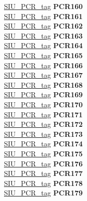 \begin{DoxyCompactItemize}
\begin{tabbing}
\>\>\mbox{\hyperlink{unionSIU__tag_1_1SIU__PCR__tag}{SIU\_PCR\_tag}} {\bfseries PCR160}\\
\>\>\mbox{\hyperlink{unionSIU__tag_1_1SIU__PCR__tag}{SIU\_PCR\_tag}} {\bfseries PCR161}\\
\>\>\mbox{\hyperlink{unionSIU__tag_1_1SIU__PCR__tag}{SIU\_PCR\_tag}} {\bfseries PCR162}\\
\>\>\mbox{\hyperlink{unionSIU__tag_1_1SIU__PCR__tag}{SIU\_PCR\_tag}} {\bfseries PCR163}\\
\>\>\mbox{\hyperlink{unionSIU__tag_1_1SIU__PCR__tag}{SIU\_PCR\_tag}} {\bfseries PCR164}\\
\>\>\mbox{\hyperlink{unionSIU__tag_1_1SIU__PCR__tag}{SIU\_PCR\_tag}} {\bfseries PCR165}\\
\>\>\mbox{\hyperlink{unionSIU__tag_1_1SIU__PCR__tag}{SIU\_PCR\_tag}} {\bfseries PCR166}\\
\>\>\mbox{\hyperlink{unionSIU__tag_1_1SIU__PCR__tag}{SIU\_PCR\_tag}} {\bfseries PCR167}\\
\>\>\mbox{\hyperlink{unionSIU__tag_1_1SIU__PCR__tag}{SIU\_PCR\_tag}} {\bfseries PCR168}\\
\>\>\mbox{\hyperlink{unionSIU__tag_1_1SIU__PCR__tag}{SIU\_PCR\_tag}} {\bfseries PCR169}\\
\>\>\mbox{\hyperlink{unionSIU__tag_1_1SIU__PCR__tag}{SIU\_PCR\_tag}} {\bfseries PCR170}\\
\>\>\mbox{\hyperlink{unionSIU__tag_1_1SIU__PCR__tag}{SIU\_PCR\_tag}} {\bfseries PCR171}\\
\>\>\mbox{\hyperlink{unionSIU__tag_1_1SIU__PCR__tag}{SIU\_PCR\_tag}} {\bfseries PCR172}\\
\>\>\mbox{\hyperlink{unionSIU__tag_1_1SIU__PCR__tag}{SIU\_PCR\_tag}} {\bfseries PCR173}\\
\>\>\mbox{\hyperlink{unionSIU__tag_1_1SIU__PCR__tag}{SIU\_PCR\_tag}} {\bfseries PCR174}\\
\>\>\mbox{\hyperlink{unionSIU__tag_1_1SIU__PCR__tag}{SIU\_PCR\_tag}} {\bfseries PCR175}\\
\>\>\mbox{\hyperlink{unionSIU__tag_1_1SIU__PCR__tag}{SIU\_PCR\_tag}} {\bfseries PCR176}\\
\>\>\mbox{\hyperlink{unionSIU__tag_1_1SIU__PCR__tag}{SIU\_PCR\_tag}} {\bfseries PCR177}\\
\>\>\mbox{\hyperlink{unionSIU__tag_1_1SIU__PCR__tag}{SIU\_PCR\_tag}} {\bfseries PCR178}\\
\>\>\mbox{\hyperlink{unionSIU__tag_1_1SIU__PCR__tag}{SIU\_PCR\_tag}} {\bfseries PCR179}\\

\end{tabbing}
\end{DoxyCompactItemize}
